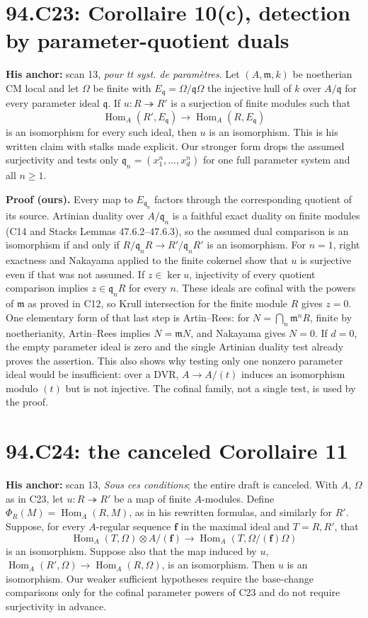 \documentclass[11pt]{article}
\newcommand{\Hom}{\operatorname{Hom}}
\newcommand{\m}{\mathfrak m}
\begin{document}
\section{94.C23: Corollaire 10(c), detection by parameter-quotient duals}
\label{C23}
\textbf{His anchor:} scan 13, \emph{pour tt syst. de param\`etres}.
Let $(A,\m,k)$ be noetherian CM local and let $\Omega$ be finite with
$E_{\mathfrak q}=\Omega/\mathfrak q\Omega$ the injective hull of $k$
over $A/\mathfrak q$ for every parameter ideal $\mathfrak q$.
If $u:R\twoheadrightarrow R'$ is a surjection of finite modules
such that
\[
 \Hom_A(R',E_{\mathfrak q})\longrightarrow
 \Hom_A(R,E_{\mathfrak q})
\]
is an isomorphism for every such ideal, then $u$ is an isomorphism.
This is his written claim with stalks made explicit. Our stronger
form drops the assumed surjectivity and tests only
$\mathfrak q_n=(x_1^n,\ldots,x_d^n)$ for one full parameter system
and all $n\ge1$.

\textbf{Proof (ours).} Every map to $E_{\mathfrak q_n}$ factors through
the corresponding quotient of its source. Artinian duality over
$A/\mathfrak q_n$ is a faithful exact duality on finite modules
(C14 and Stacks Lemmas 47.6.2--47.6.3), so the assumed dual comparison
is an isomorphism if and only if
$R/\mathfrak q_nR\to R'/\mathfrak q_nR'$ is an isomorphism.
For $n=1$, right exactness and Nakayama applied to the finite cokernel
show that $u$ is surjective even if that was not assumed. If
$z\in\ker u$, injectivity of every quotient comparison implies
$z\in\mathfrak q_nR$ for every $n$. These ideals are cofinal with
the powers of $\m$ as proved in C12, so Krull intersection for the
finite module $R$ gives $z=0$. One elementary form of that last step
is Artin--Rees: for $N=\bigcap_n\m^nR$, finite by noetherianity,
Artin--Rees implies $N=\m N$, and Nakayama gives $N=0$.
If $d=0$, the empty parameter ideal is zero and the single Artinian
duality test already proves the assertion. This also shows why testing
only one nonzero parameter ideal would be insufficient: over a DVR,
$A\to A/(t)$ induces an isomorphism modulo $(t)$ but is not injective.
The cofinal family, not a single test, is used by the proof.

\section{94.C24: the canceled Corollaire 11}
\label{C24}
\textbf{His anchor:} scan 13, \emph{Sous ces conditions}; the entire
draft is canceled. With $A$, $\Omega$ as in C23, let
$u:R\twoheadrightarrow R'$ be a map of finite $A$-modules. Define
$\Phi_R(M)=\Hom_A(R,M)$, as in his rewritten formulas, and similarly
for $R'$. Suppose, for every $A$-regular sequence $\mathbf f$ in the
maximal ideal and $T=R,R'$, that
\[
 \Hom_A(T,\Omega)\otimes A/(\mathbf f)
 \longrightarrow\Hom_A(T,\Omega/(\mathbf f)\Omega)
\]
is an isomorphism. Suppose also that the map induced by $u$,
$\Hom_A(R',\Omega)\to\Hom_A(R,\Omega)$, is an isomorphism.
Then $u$ is an isomorphism. Our weaker sufficient hypotheses require
the base-change comparisons only for the cofinal parameter powers
of C23 and do not require surjectivity in advance.
\end{document}
